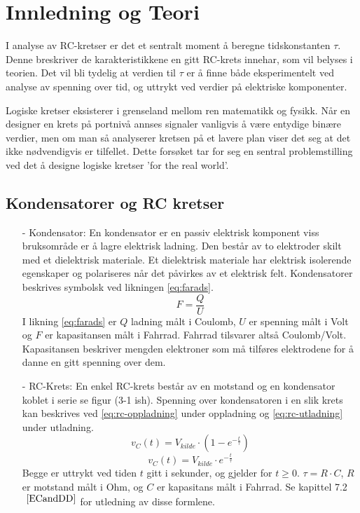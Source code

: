 \section{Innledning og Teori}

    I analyse av RC-kretser er det et sentralt moment å beregne tidskonstanten $\tau$.
    Denne breskriver de karakteristikkene en gitt RC-krets innehar, som vil belyses i teorien.
    Det vil bli tydelig at verdien til $\tau$ er å finne både eksperimentelt ved analyse av spenning over tid, og uttrykt ved verdier på elektriske komponenter.

    Logiske kretser eksisterer i grenseland mellom ren matematikk og fysikk.
    Når en designer en krets på portnivå annses signaler vanligvis å være entydige binære verdier, men om man så analyserer kretsen på et lavere plan viser det seg at det ikke nødvendigvis er tilfellet.
    Dette forsøket tar for seg en sentral problemstilling ved det å designe logiske kretser 'for the real world'.

\subsection{Kondensatorer og RC kretser}

    \begin{itemize}
        \item[-] Kondensator: En kondensator er en passiv elektrisk komponent viss bruksområde er å lagre elektrisk ladning.
        Den består av to elektroder skilt med et dielektrisk materiale.
        Et dielektrisk materiale har elektrisk isolerende egenskaper og polariseres når det påvirkes av et elektrisk felt.
        Kondensatorer beskrives symbolsk ved likningen \ref{eq:farads}.
        \begin{equation}
            F = \frac{Q}{U}
            \label{eq:farads}
        \end{equation}
        I likning \ref{eq:farads} er $Q$ ladning målt i Coulomb, $U$ er spenning målt i Volt og $F$ er kapasitansen målt i Fahrrad.
        Fahrrad tilsvarer altså Coulomb/Volt.
        Kapasitansen beskriver mengden elektroner som må tilføres elektrodene for å danne en gitt spenning over dem.
        \item[-] RC-Krets: En enkel RC-krets består av en motstand og en kondensator koblet i serie se figur (3-1 ish).
        Spenning over kondensatoren i en slik krets kan beskrives ved \ref{eq:rc-oppladning} under oppladning og \ref{eq:rc-utladning} under utladning.
        \begin{equation}
            v_{C}(t) = V_{kilde} \cdot \left( 1 - e^{-\frac{t}{\tau}} \right)
            \label{eq:rc-oppladning}
        \end{equation}
        \begin{equation}
            v_{C}(t) = V_{kilde} \cdot e^{-\frac{t}{\tau}}
            \label{eq:rc-utladning}
        \end{equation}
        Begge er uttrykt ved tiden $t$ gitt i sekunder, og gjelder for $t \geq 0$.
        $\tau = R \cdot C$, $R$ er motstand målt i Ohm, og $C$ er kapasitans målt i Fahrrad.
        Se kapittel 7.2$^{~\ref{ECandDD}}$ for utledning av disse formlene.
    \end{itemize}

